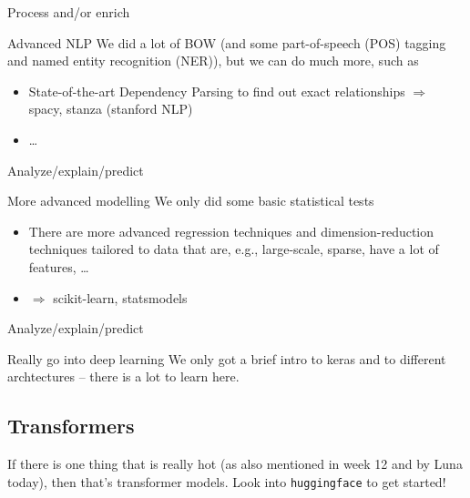 \begin{frame}{Process and/or enrich}
	\begin{block}{Advanced NLP}
		We did a lot of BOW (and some part-of-speech (POS) tagging and named entity recognition (NER)), but we can do much more, such as 
		\begin{itemize}
			\item State-of-the-art Dependency Parsing to find out exact relationships
			$\Rightarrow$  spacy, stanza (stanford NLP)
                        \item \ldots
		\end{itemize}
	\end{block}
\end{frame}


 
\begin{frame}{Analyze/explain/predict}
	\begin{block}{More advanced modelling}
		We only did some basic statistical tests
		\begin{itemize}
			\item There are more advanced regression techniques and dimension-reduction techniques tailored to data that are, e.g., large-scale, sparse, have a lot of features, \ldots
			\item $\Rightarrow$ scikit-learn, statsmodels
		\end{itemize}
	\end{block}
\end{frame}


 
\begin{frame}{Analyze/explain/predict}
	\begin{block}{Really go into deep learning}
		We only got a brief intro to keras and to different archtectures -- there is a lot to learn here.
                \end{block}
\end{frame}






\subsection{Transformers}

\begin{frame}[standout]
If there is one thing that is really hot (as also mentioned in week 12 and by Luna today), then that's transformer models. Look into \texttt{huggingface} to get started!
\end{frame}

